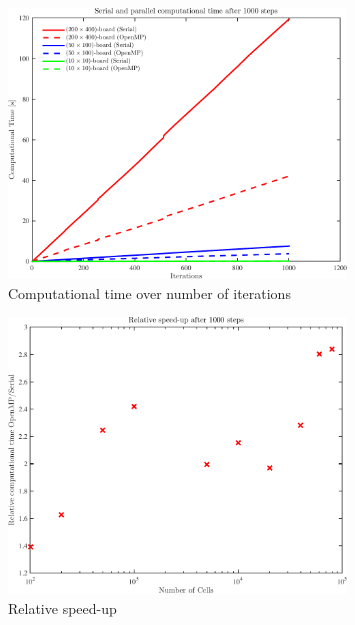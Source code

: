 \begin{figure}\centering
	\includegraphics[width=0.8\textwidth]{figures/SerialOpenMP_Iterations.pdf}
	\caption{Computational time over number of iterations}
	\label{fig:computationalTimeOverIterations}
\end{figure}

\begin{figure}\centering
	\includegraphics[width=0.8\textwidth]{figures/SerialOpenMP_Speedup.pdf}
	\caption{Relative speed-up}
	\label{fig:computationalTimeSpeedup}
\end{figure}